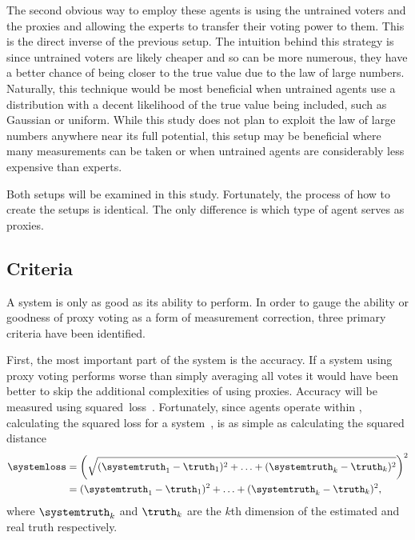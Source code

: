 The second obvious way to employ these agents is using the untrained voters
and the proxies and allowing the experts to transfer their voting power to them.
This is the direct inverse of the previous setup.
The intuition behind this strategy is since untrained voters are likely
cheaper and so can be more numerous, they have a better chance of being closer
to the true value due to the law of large numbers.
Naturally, this technique would be most beneficial when untrained agents use a
distribution with a decent likelihood of the true value being included, such
as Gaussian or uniform.
While this study does not plan to exploit the law of large numbers anywhere
near its full potential, this setup may be beneficial where many measurements
can be taken or when untrained agents are considerably less expensive than
experts.

Both setups will be examined in this study.
Fortunately, the process of how to create the setups is identical.
The only difference is which type of agent serves as proxies.

\subsection{Criteria}\label{subsec:criteria}
A system is only as good as its ability to perform.
In order to gauge the ability or goodness of proxy voting as a form of
measurement correction, three primary criteria have been identified.

First, the most important part of the system is the accuracy.
If a system using proxy voting performs worse than simply averaging all votes
it would have been better to skip the additional complexities of using
proxies.
Accuracy will be measured using squared~loss~\loss.
Fortunately, since agents operate within \systemspace, calculating the
squared loss for a system~\systemloss, is as simple as calculating the
squared distance
\begin{align}
    \systemloss &= {
        \left(\sqrt{
            (\systemtruth_1 - \truth_1)^2 +
            \mathellipsis +
            (\systemtruth_k - \truth_k)^2
        }\right)
    }^2 \nonumber \\
    &= (\systemtruth_1 - \truth_1)^2 +
    \mathellipsis +
    (\systemtruth_k - \truth_k)^2
    \text{,}\label{eq:loss}
\end{align}
where $\systemtruth_k$ and $\truth_k$ are the $k$th
dimension of the estimated and real truth respectively.

